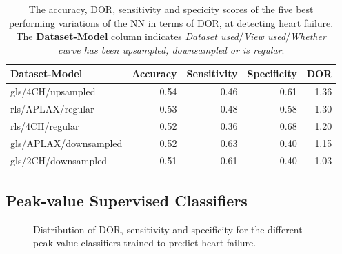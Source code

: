 \begin{table}
    \centering
    \begin{tabular}{lrrrr}
        \toprule
        Dataset-Model         &  Accuracy &  Sensitivity &  Specificity &  DOR \\
        \midrule
        gls/4CH/upsampled     &      0.54 &         0.46 &         0.61 & 1.36 \\
        rls/APLAX/regular     &      0.53 &         0.48 &         0.58 & 1.30 \\
        rls/4CH/regular       &      0.52 &         0.36 &         0.68 & 1.20 \\
        gls/APLAX/downsampled &      0.52 &         0.63 &         0.40 & 1.15 \\
        gls/2CH/downsampled   &      0.51 &         0.61 &         0.40 & 1.03 \\
        \bottomrule
    \end{tabular}
    \caption{The accuracy, DOR, sensitivity and specicity scores of the five best performing variations of the NN in terms of DOR, at detecting heart failure.
             The \textbf{Dataset-Model} column indicates \textit{Dataset used}$/$\textit{View used}$/$\textit{Whether curve has been upsampled, downsampled or is regular}.}
    \label{tab:dl_hf_dor_sens_spec_dist}
\end{table}

\newpage

\subsection{Peak-value Supervised Classifiers}

\begin{figure}[htb]
    \centering
    
    \caption{Distribution of DOR, sensitivity and specificity for the different peak-value classifiers trained to predict heart failure.}
    \label{fig:pvmlc_hf_dor_sens_spec_dis}
\end{figure}

